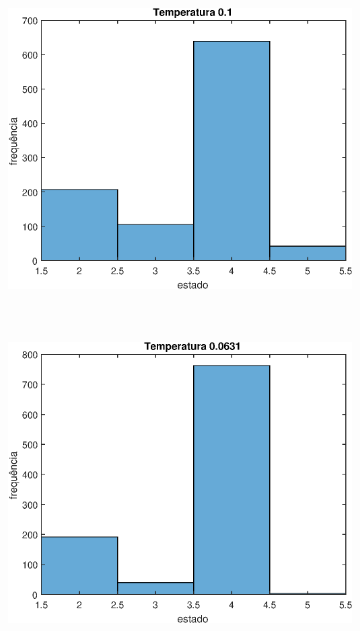 \documentclass[12pt]{article}
\newenvironment{exercise}[2][Exercício]{\begin{trivlist}
\item[\hskip \labelsep {\bfseries #1}\hskip \labelsep {\bfseries #2.}]}{\end{trivlist}}
\begin{document}
\begin{exercise}{2.e}
\begin{figure}[H]
    \centering
    \begin{subfigure}[b]{0.3\textwidth}
        \includegraphics[width=\textwidth]{figs/ex2e_h1.eps}
    \end{subfigure}
    ~ 
    \begin{subfigure}[b]{0.3\textwidth}
        \includegraphics[width=\textwidth]{figs/ex2e_h2.eps}
    \end{subfigure}
    ~
    \begin{subfigure}[b]{0.3\textwidth}

\end{subfigure}
\end{figure}
\end{exercise}
\end{document}
